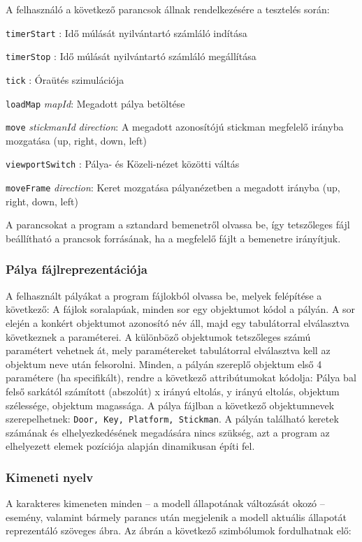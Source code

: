	    A felhasználó a következő parancsok állnak rendelkezésére a tesztelés során:
	    
	    \newcommand{\cmd}[1]{\item{\texttt{#1}} }
	    \begin{description}
	        \cmd{timerStart}: Idő múlását nyilvántartó számláló indítása
	        \cmd{timerStop}: Idő múlását nyilvántartó számláló megállítása
	        \cmd{tick}: Óraütés szimulációja
	        \cmd{loadMap} \emph{mapId}: Megadott pálya betöltése
	        \cmd{move} \emph{stickmanId} \emph{direction}: A megadott azonosítójú stickman megfelelő irányba mozgatása (up, right, down, left)
	        \cmd{viewportSwitch}: Pálya- és Közeli-nézet közötti váltás
	        \cmd{moveFrame} \emph{direction}: Keret mozgatása pályanézetben a megadott irányba (up, right, down, left)
        \end{description}
        
        A parancsokat a program a sztandard bemenetről olvassa be, így tetszőleges fájl beállítható a prancsok forrásának, ha a megfelelő fájlt a bemenetre irányítjuk.
        
        \subsubsection{Pálya fájlreprezentációja}
        A felhasznált pályákat a program fájlokból olvassa be, melyek felépítése a következő: A fájlok soralapúak, minden sor egy objektumot kódol a pályán. A sor elején a konkért objektumot azonosító név áll, majd egy tabulátorral elválasztva következnek a paraméterei. A különböző objektumok tetszőleges számú paramétert vehetnek át, mely paramétereket tabulátorral elválasztva kell az objektum neve után felsorolni. Minden, a pályán szereplő objektum első 4 paramétere (ha specifikált), rendre a következő attribútumokat kódolja: Pálya bal felső sarkától számított (abszolút) x irányú eltolás, y irányú eltolás, objektum szélessége, objektum magassága. A pálya fájlban a következő objektumnevek szerepelhetnek: \texttt{Door, Key, Platform, Stickman}. A pályán található keretek számának és elhelyezkedésének megadására nincs szükség, azt a program az elhelyezett elemek pozíciója alapján dinamikusan építi fel.
        
	    \subsubsection{Kimeneti nyelv}	
	    A karakteres kimeneten minden -- a modell állapotának változását okozó -- esemény, valamint bármely parancs után megjelenik a modell aktuális állapotát reprezentáló szöveges ábra. Az ábrán a következő szimbólumok fordulhatnak elő:
	    
